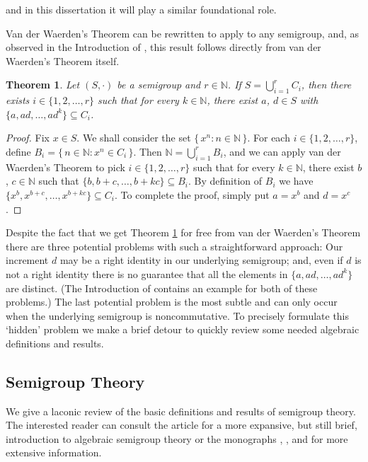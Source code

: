 \documentclass[12pt]{article}
\theoremstyle{plain}
\newtheorem{thm}{Theorem}[section]
\theoremstyle{definition}
\newcommand{\bbN}{\mathbb{N}}
\begin{document}
and in this dissertation it will play a similar foundational role. 

Van der Waerden's Theorem can be rewritten to apply to any semigroup, and, as observed in the Introduction of \cite{Bergelson:1992fk}, this result follows directly from van der Waerden's Theorem itself.

\begin{thm}
  \label{thm:semigrp-vdw}
  Let $(S, \cdot)$ be a semigroup and $r \in \bbN$.
  If $S = \bigcup_{i=1}^r C_i$, then there exists $i \in \{1, 2, \ldots, r\}$ such that for every $k \in \bbN$, there exist $a$, $d \in S$ with $\{ a, ad, \ldots, ad^k \} \subseteq C_i$.
\end{thm}
\begin{proof}
  Fix $x \in S$.
  We shall consider the set $\{\, x^n : n \in \bbN \,\}$.
  For each $i \in \{1, 2, \ldots, r\}$, define $B_i = \{\, n \in \bbN : x^n \in C_i \,\}$. 
  Then $\bbN = \bigcup_{i=1}^r B_i$, and we can apply van der Waerden's Theorem to pick $i \in \{1, 2, \ldots, r\}$ such that for every $k \in \bbN$, there exist $b$, $c \in \bbN$ such that $\{ b, b+c, \ldots, b+ k c \} \subseteq B_i$. 
  By definition of $B_i$ we have $\{ x^b, x^{b+c}, \ldots, x^{b + k c} \} \subseteq C_i$.
  To complete the proof, simply put $a = x^b$ and $d = x^c$.
\end{proof}

Despite the fact that we get Theorem \ref{thm:semigrp-vdw} for free from van der Waerden's Theorem there are three potential problems with such a straightforward approach:
Our increment $d$ may be a right identity in our underlying semigroup; and, even if $d$ is not a right identity there is no guarantee that all the elements in $\{a, ad, \ldots, ad^k\}$ are distinct.
(The Introduction of \cite{Bergelson:1992fk} contains an example for both of these problems.)
The last potential problem is the most subtle and can only occur when the underlying semigroup is noncommutative.
To precisely formulate this `hidden' problem we make a brief detour to quickly review some needed algebraic definitions and results.

\subsection{Semigroup Theory}
We give a laconic review of the basic definitions and results of semigroup theory.
The interested reader can consult the article \cite{Hollings:2007uq} for a more expansive, but still brief, introduction to algebraic semigroup theory or the monographs \cite{Clifford:1961fk}, \cite{Clifford:1967fk}, and \cite[Chapter 1]{Hindman:1998fk} for more extensive information. 
\end{document}
